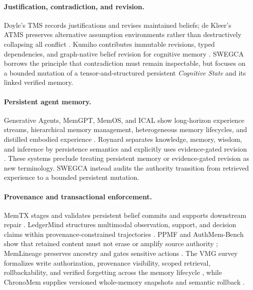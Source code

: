 \documentclass[10pt]{article}
\newcommand{\swegca}{\textsc{SWEGCA}}
\newcommand{\cstate}{\textit{Cognitive State}}
\begin{document}
\paragraph{Justification, contradiction, and revision.}
Doyle's TMS records justifications and revises maintained beliefs; de Kleer's ATMS preserves alternative assumption environments rather than destructively collapsing all conflict \cite{doyle1979tms,dekleer1986atms}. Kumiho contributes immutable revisions, typed dependencies, and graph-native belief revision for cognitive memory \cite{park2026kumiho}. \swegca{} borrows the principle that contradiction must remain inspectable, but focuses on a bounded mutation of a tensor-and-structured persistent \cstate{} and its linked verified memory.

\paragraph{Persistent agent memory.}
Generative Agents, MemGPT, MemOS, and ICAL show long-horizon experience streams, hierarchical memory management, heterogeneous memory lifecycles, and distilled embodied experience \cite{park2023generative,packer2023memgpt,li2025memos,sarch2024ical}. Roynard separates knowledge, memory, wisdom, and inference by persistence semantics and explicitly uses evidence-gated revision \cite{roynard2026knowledge}. These systems preclude treating persistent memory or evidence-gated revision as new terminology. \swegca{} instead audits the authority transition from retrieved experience to a bounded persistent mutation.

\paragraph{Provenance and transactional enforcement.}
MemTX stages and validates persistent belief commits and supports downstream repair \cite{li2026memtx}. LedgerMind structures multimodal observation, support, and decision claims within provenance-constrained trajectories \cite{du2026ledgermind}. PPMF and AuthMem-Bench show that retained content must not erase or amplify source authority \cite{xu2026provenance,zhan2026authority}; MemLineage preserves ancestry and gates sensitive actions \cite{ouyang2026memlineage}. The VMG survey formalizes write authorization, provenance visibility, scoped retrieval, rollbackability, and verified forgetting across the memory lifecycle \cite{lin2026security}, while ChronoMem supplies versioned whole-memory snapshots and semantic rollback \cite{su2026chronomem}.
\end{document}
